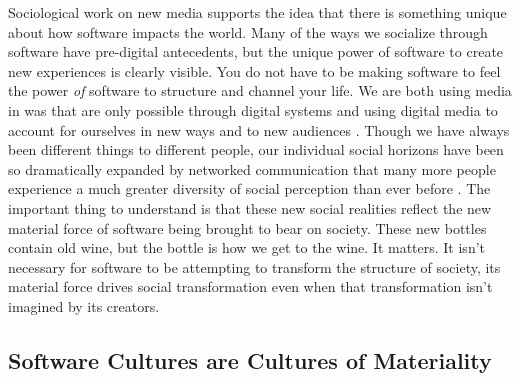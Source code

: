 \documentclass[a4paper,man,natbib,floatsintext]{apa6}
\begin{document}
  Sociological work on new media supports the idea that there is something unique about how software impacts the world. Many of the ways we socialize through software have pre-digital antecedents, but the unique power of software to create new experiences is clearly visible. You do not have to be making software to feel the power \textit{of} software to structure and channel your life. We are both using media in was that are only possible through digital systems and using digital media to account for ourselves in new ways and to new audiences \citep{Humphreys2018-ge,Jurgenson2019-tl}. Though we have always been different things to different people, our individual social horizons have been so dramatically expanded by networked communication that many more people experience a much greater diversity of social perception than ever before \citep{Dean2010-lk}. The important thing to understand is that these new social realities reflect the new material force of software being brought to bear on society. These new bottles contain old wine, but the bottle is how we get to the wine. It matters. It isn't necessary for software to be attempting to transform the structure of society, its material force drives social transformation even when that transformation isn't imagined by its creators. 


  \subsection{Software Cultures are Cultures of Materiality}
\end{document}
